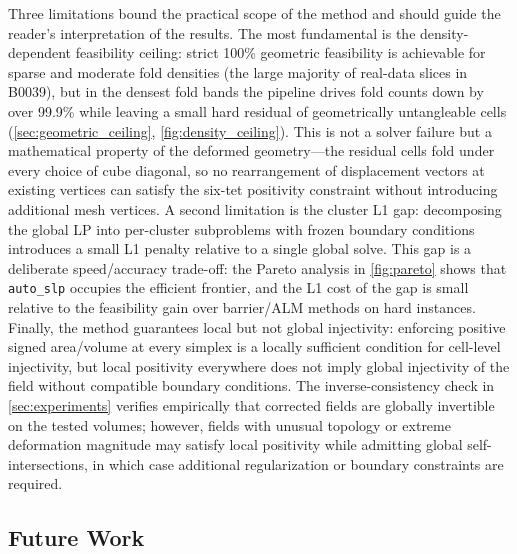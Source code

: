 \documentclass[lettersize,journal]{IEEEtran}
\begin{document}
Three limitations bound the practical scope of the method and should guide the reader's interpretation of the results. The most fundamental is the density-dependent feasibility ceiling: strict 100\% geometric feasibility is achievable for sparse and moderate fold densities (the large majority of real-data slices in B0039), but in the densest fold bands the pipeline drives fold counts down by over 99.9\% while leaving a small hard residual of geometrically untangleable cells (\autoref{sec:geometric_ceiling}, \autoref{fig:density_ceiling}). This is not a solver failure but a mathematical property of the deformed geometry---the residual cells fold under every choice of cube diagonal, so no rearrangement of displacement vectors at existing vertices can satisfy the six-tet positivity constraint without introducing additional mesh vertices. A second limitation is the cluster L1 gap: decomposing the global LP into per-cluster subproblems with frozen boundary conditions introduces a small L1 penalty relative to a single global solve. This gap is a deliberate speed/accuracy trade-off: the Pareto analysis in \autoref{fig:pareto} shows that \texttt{auto\_slp} occupies the efficient frontier, and the L1 cost of the gap is small relative to the feasibility gain over barrier/ALM methods on hard instances. Finally, the method guarantees local but not global injectivity: enforcing positive signed area/volume at every simplex is a locally sufficient condition for cell-level injectivity, but local positivity everywhere does not imply global injectivity of the field without compatible boundary conditions. The inverse-consistency check in \autoref{sec:experiments} verifies empirically that corrected fields are globally invertible on the tested volumes; however, fields with unusual topology or extreme deformation magnitude may satisfy local positivity while admitting global self-intersections, in which case additional regularization or boundary constraints are required.

\subsection{Future Work}
\label{sec:future_work}
\end{document}
